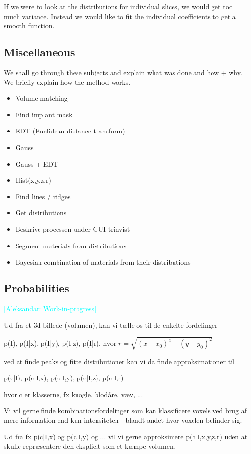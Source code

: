 \documentclass[times,twocolumn,final]{elsarticle}
\newcommand{\aleksandar}[1]{\textcolor{cyan}{[Aleksandar: #1]}}
\begin{document}
If we were to look at the distributions for individual slices, we would get too much variance.
Instead we would like to fit the individual coefficients to get a smooth function.

\subsection*{Miscellaneous}

We shall go through these subjects and explain what was done and how + why. We briefly explain how the method works.

\begin{itemize}
 \item Volume matching
 \item Find implant mask
 \item EDT (Euclidean distance transform)
 \item Gauss
 \item Gauss + EDT
 \item Hist(x,y,z,r)
 \item Find lines / ridges
 \item Get distributions
 \item Beskrive processen under GUI trinvist
 \item Segment materials from distributions
 \item Bayesian combination of materials from their distributions
\end{itemize}

\subsection*{Probabilities}

\aleksandar{Work-in-progress}

Ud fra et 3d-billede (volumen), kan vi tælle os til de enkelte fordelinger

p(I), p(I|x), p(I|y), p(I|z), p(I|r), hvor $r=\sqrt{(x-x_0)^2+(y-y_0)^2}$

ved at finde peaks og fitte distributioner kan vi da finde approksimationer til

p(c|I), p(c|I,x), p(c|I,y), p(c|I,z), p(c|I,r)

hvor c er klasserne, fx knogle, blodåre, væv, ... 

Vi vil gerne finde kombinationsfordelinger som kan klassificere voxels ved brug af mere information end kun intensiteten - blandt andet hvor voxelen befinder sig.

Ud fra fx p(c|I,x) og p(c|I,y) og ... vil vi gerne approksimere p(c|I,x,y,z,r) uden at skulle repræsentere den eksplicit som et kæmpe volumen.
\end{document}
